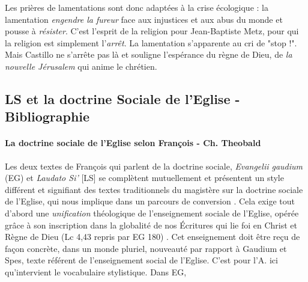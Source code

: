 Les prières de lamentations sont donc adaptées à la crise écologique : la lamentation \textit{engendre la fureur} face aux injustices et aux abus du monde et pousse à \textit{résister}. C'est l'esprit de la religion pour Jean-Baptiste Metz, pour qui la religion est simplement l'\textit{arrêt}. La lamentation s'apparente au cri de "stop !". Mais Castillo ne s'arrête pas là et souligne l'espérance du règne de Dieu, de \textit{la nouvelle Jérusalem} qui anime le chrétien. 



 


\subsection{LS et la doctrine Sociale de l'Eglise - Bibliographie}


\paragraph{La doctrine sociale de l'Eglise selon François - Ch. Theobald} \cite{theobald_lenseignement_2016} Les deux textes de François qui parlent de la doctrine sociale, \textit{Evangelii gaudium} (EG) et \textit{Laudato Si’} [LS]  se complètent mutuellement et présentent un style différent et signifiant des textes traditionnels du magistère sur la doctrine sociale de l'Eglise, qui nous implique dans un parcours de conversion \cite[par. 4]{theobald_lenseignement_2016}. Cela exige tout d'abord une \textit{unification} théologique de l'enseignement sociale de l'Eglise,  opérée grâce à son inscription dans la globalité de nos Écritures qui lie foi en Christ et Règne de Dieu (Lc 4,43 repris par EG 180) . Cet enseignement doit être reçu de façon concrète, dans un monde pluriel, nouveauté par rapport à Gaudium et Spes, texte référent de l'enseignement social de l'Eglise.  C'est pour l'A. ici qu'intervient le vocabulaire stylistique.  Dans EG, 

